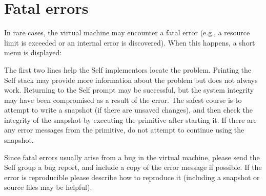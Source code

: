 \documentclass[letterpaper,10pt,english]{sphinxmanual}
\begin{document}

\section{Fatal errors}
\label{\detokenize{vmref:index-7}}\label{\detokenize{vmref:fatal-errors}}
In rare cases, the virtual machine may encounter a fatal error (e.g., a resource limit is exceeded or
an internal error is discovered). When this happens, a short menu is displayed:

\begin{sphinxVerbatim}[commandchars=\\\{\}]
          
         
   
        
      
       
    
 
\end{sphinxVerbatim}

The first two lines help the Self implementors locate the problem. Printing the Self stack may
provide more information about the problem but does not always work. Returning to the Self
prompt may be successful, but the system integrity may have been compromised as a result of the
error. The safest course is to attempt to write a snapshot (if there are unsaved changes), and then
check the integrity of the snapshot by executing the primitive  after starting it. If there are
any error messages from the primitive, do not attempt to continue using the snapshot.

Since fatal errors usually arise from a bug in the virtual machine, please send the Self group a bug
report, and include a copy of the error message if possible. If the error is reproducible please describe
how to reproduce it (including a snapshot or source files may be helpful).
\end{document}

